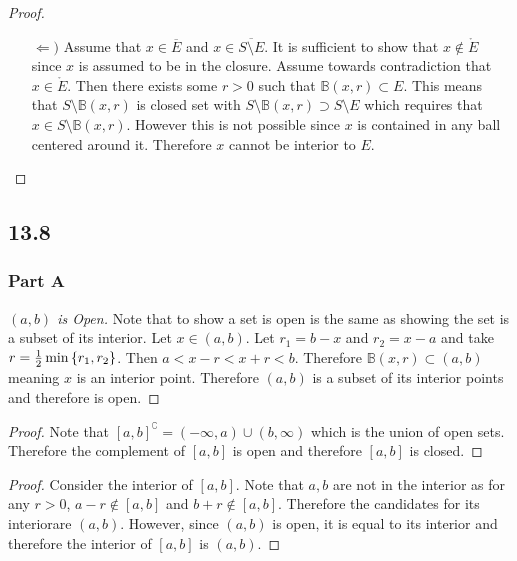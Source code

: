 \documentclass[12pt,titlepage]{extarticle}
\begin{document}
\begin{proof}
\begin{enumerate}
\begin{enumerate}
            \item[$\Leftarrow)$] %
                Assume that $x \in \overline{E}$ and $x \in \overline{S \setminus E}$. It is sufficient to show that $x \notin \mathring{E}$ since $x$ is assumed to be in the closure. Assume towards contradiction that $x \in \mathring{E}$. Then there exists some $r > 0$ such that $\mathbb{B}(x,r) \subset E$. This means that $S \setminus \mathbb{B}(x,r)$ is closed set with $S \setminus \mathbb{B}(x,r) \supset S \setminus E$ which requires that $x \in S \setminus \mathbb{B}(x,r)$. However this is not possible since $x$ is contained in any ball centered around it. Therefore $x$ cannot be interior to $E$.
        \end{enumerate}
    \end{enumerate}
\end{proof}

\subsection*{13.8}
\subsubsection*{Part A}
\begin{proof}[$(a,b)$ is Open]
    Note that to show a set is open is the same as showing the set is a subset of its interior. Let $x \in (a,b)$. Let $r_1 = b-x$ and $r_2 = x - a$ and take $r = \frac{1}{2} \min\qty{r_1, r_2}$. Then $a < x - r < x + r < b$. Therefore $\mathbb{B}(x,r) \subset (a,b)$ meaning $x$ is an interior point. Therefore $(a,b)$ is a subset of its interior points and therefore is open.
\end{proof}

\begin{proof}
    Note that $[a,b]^\complement = (-\infty, a)\cup(b, \infty)$ which is the union of open sets. Therefore the complement of $[a,b]$ is open and therefore $[a,b]$ is closed.
\end{proof}

\begin{proof}
    Consider the interior of $[a,b]$. Note that $a,b$ are not in the interior as for any $r > 0$, $a - r \notin [a,b]$ and $b + r \notin [a,b]$. Therefore the candidates for its interiorare $(a,b)$. However, since $(a,b)$ is open, it is equal to its interior and therefore the interior of $[a,b]$ is $(a,b)$.
\end{proof}
\end{document}
